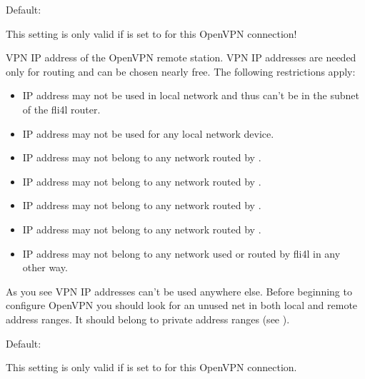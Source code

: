 \begin{description}


  Default: 

  This setting is only valid if  
  is set to  for this OpenVPN connection!

  VPN IP address of the OpenVPN remote station. VPN IP addresses are needed only 
  for routing and can be chosen nearly free. The following restrictions apply:

\begin{itemize}

\item IP address may not be used in local network and thus can't be in the subnet of the fli4l router.

\item IP address may not be used for any local network device.

\item IP address may not belong to any network routed by .

\item IP address may not belong to any network routed by .

\item IP address may not belong to any network routed by .

\item IP address may not belong to any network routed by .

\item IP address may not belong to any network used or routed by fli4l in any other way.

\end{itemize}

  As you see VPN IP addresses can't be used anywhere else. Before beginning to configure 
  OpenVPN you should look for an unused net in both local and remote address ranges. 
  It should belong to private address ranges (see ).


  Default: 

  This setting is only valid if  
  is set to  for this OpenVPN connection.


\end{description}
